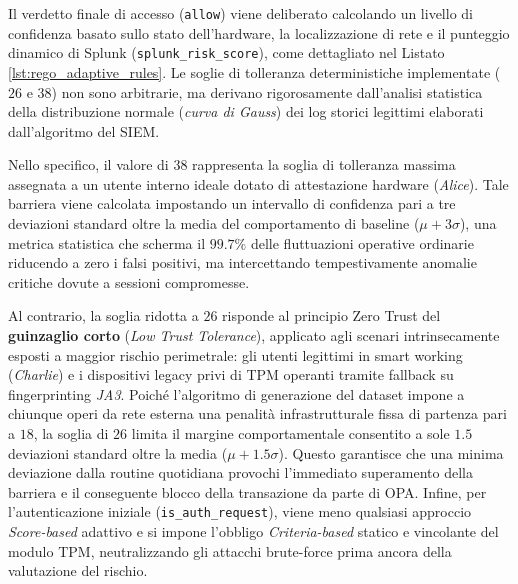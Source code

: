 Il verdetto finale di accesso (\texttt{allow}) viene deliberato calcolando un livello di confidenza basato sullo stato dell'hardware, la localizzazione di rete e il punteggio dinamico di Splunk (\texttt{splunk\_risk\_score}), come dettagliato nel Listato \ref{lst:rego_adaptive_rules}. Le soglie di tolleranza deterministiche implementate (\(26\) e \(38\)) non sono arbitrarie, ma derivano rigorosamente dall'analisi statistica della distribuzione normale (\textit{curva di Gauss}) dei log storici legittimi elaborati dall'algoritmo del SIEM. 

Nello specifico, il valore di \(38\) rappresenta la soglia di tolleranza massima assegnata a un utente interno ideale dotato di attestazione hardware (\textit{Alice}). Tale barriera viene calcolata impostando un intervallo di confidenza pari a tre deviazioni standard oltre la media del comportamento di baseline (\(\mu + 3\sigma\)), una metrica statistica che scherma il \(99.7\%\) delle fluttuazioni operative ordinarie riducendo a zero i falsi positivi, ma intercettando tempestivamente anomalie critiche dovute a sessioni compromesse. 

Al contrario, la soglia ridotta a \(26\) risponde al principio Zero Trust del \textbf{guinzaglio corto} (\textit{Low Trust Tolerance}), applicato agli scenari intrinsecamente esposti a maggior rischio perimetrale: gli utenti legittimi in smart working (\textit{Charlie}) e i dispositivi legacy privi di TPM operanti tramite fallback su fingerprinting \textit{JA3}. Poiché l'algoritmo di generazione del dataset impone a chiunque operi da rete esterna una penalità infrastrutturale fissa di partenza pari a \(18\), la soglia di \(26\) limita il margine comportamentale consentito a sole \(1.5\) deviazioni standard oltre la media (\(\mu + 1.5\sigma\)). Questo garantisce che una minima deviazione dalla routine quotidiana provochi l'immediato superamento della barriera e il conseguente blocco della transazione da parte di OPA. Infine, per l'autenticazione iniziale (\texttt{is\_auth\_request}), viene meno qualsiasi approccio \textit{Score-based} adattivo e si impone l'obbligo \textit{Criteria-based} statico e vincolante del modulo TPM, neutralizzando gli attacchi brute-force prima ancora della valutazione del rischio.

